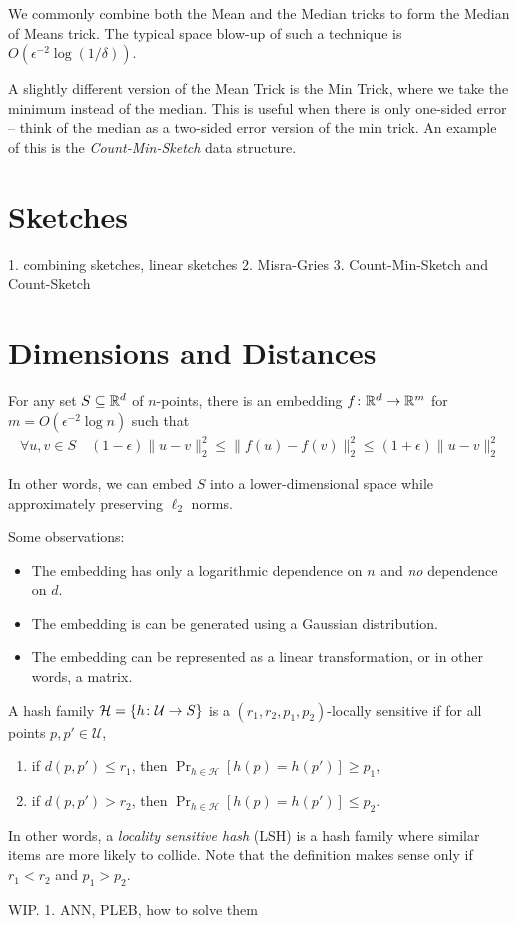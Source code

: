 \documentclass{article}
\begin{document}
We commonly combine both the Mean and the Median tricks to form the Median of Means trick.
The typical space blow-up of such a technique is $O(\epsilon^{-2} \log (1 / \delta))$.

A slightly different version of the Mean Trick is the Min Trick, where we take the minimum instead of the median.
This is useful when there is only one-sided error -- think of the median as a two-sided error version of the min trick.
An example of this is the \emph{Count-Min-Sketch} data structure.

\section{Sketches}

1. combining sketches, linear sketches
2. Misra-Gries
3. Count-Min-Sketch and Count-Sketch

\section{Dimensions and Distances}

\begin{lemma}
For any set $S \subseteq \mathbb{R}^d$ of $n$-points, there is an embedding $f \colon \mathbb{R}^d \to \mathbb{R}^m$ for $m = O(\epsilon^{-2} \log n)$ such that
\begin{align}
  \forall u, v \in S \quad (1 - \epsilon) \|u - v\|_2^2 \le \|f(u) - f(v)\|_2^2 \le (1 + \epsilon) \|u - v\|_2^2
\end{align}
\end{lemma}
In other words, we can embed $S$ into a lower-dimensional space while approximately preserving $\ell_2$ norms.

Some observations:
\begin{itemize}
  \item The embedding has only a logarithmic dependence on $n$ and \emph{no} dependence on $d$.
  \item The embedding is can be generated using a Gaussian distribution.
  \item The embedding can be represented as a linear transformation, or in other words, a matrix.
\end{itemize}

\begin{definition}
  A hash family $\mathcal{H} = \{h \colon \mathcal{U} \to S\}$ is a $(r_1, r_2, p_1, p_2)$-locally sensitive if for all points $p, p' \in \mathcal{U}$,

  \begin{enumerate}
    \item if $d(p, p') \le r_1$, then $\Pr_{h \in \mathcal{H}}[h(p) = h(p')] \ge p_1$,
    \item if $d(p, p') > r_2$, then $\Pr_{h \in \mathcal{H}}[h(p) = h(p')] \le p_2$.
  \end{enumerate}

\end{definition}
In other words, a \emph{locality sensitive hash} (LSH) is a hash family where similar items are more likely to collide.
Note that the definition makes sense only if $r_1 < r_2$ and $p_1 > p_2$.

WIP.
1. ANN, PLEB, how to solve them
\end{document}
